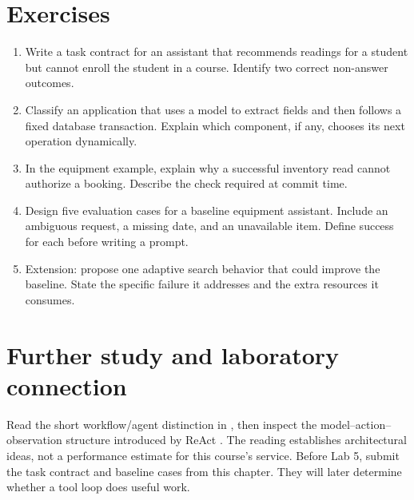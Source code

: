 \section{Exercises}
\begin{enumerate}
\item Write a task contract for an assistant that recommends readings for a student but cannot enroll the student in a course. Identify two correct non-answer outcomes.
\item Classify an application that uses a model to extract fields and then follows a fixed database transaction. Explain which component, if any, chooses its next operation dynamically.
\item In the equipment example, explain why a successful inventory read cannot authorize a booking. Describe the check required at commit time.
\item Design five evaluation cases for a baseline equipment assistant. Include an ambiguous request, a missing date, and an unavailable item. Define success for each before writing a prompt.
\item Extension: propose one adaptive search behavior that could improve the baseline. State the specific failure it addresses and the extra resources it consumes.
\end{enumerate}

\section{Further study and laboratory connection}
Read the short workflow/agent distinction in \cite{effective-agents}, then inspect the model–action–observation structure introduced by ReAct \cite{react}. The reading establishes architectural ideas, not a performance estimate for this course's service. Before Lab 5, submit the task contract and baseline cases from this chapter. They will later determine whether a tool loop does useful work.

